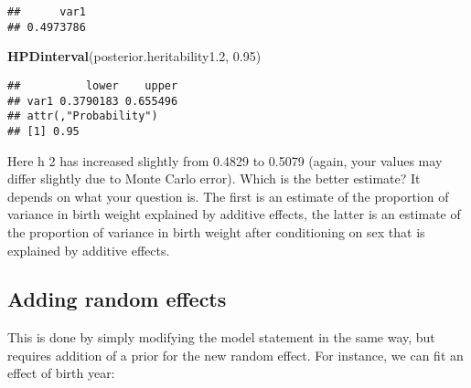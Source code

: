 \documentclass[12pt,]{book}
\newenvironment{Shaded}{\begin{snugshade}}{\end{snugshade}}
\newcommand{\FloatTok}[1]{\textcolor[rgb]{0.00,0.00,0.81}{#1}}
\newcommand{\KeywordTok}[1]{\textcolor[rgb]{0.13,0.29,0.53}{\textbf{#1}}}
\newcommand{\NormalTok}[1]{#1}
\newcommand{\OperatorTok}[1]{\textcolor[rgb]{0.81,0.36,0.00}{\textbf{#1}}}
\newcommand{\StringTok}[1]{\textcolor[rgb]{0.31,0.60,0.02}{#1}}
\begin{document}
\begin{Shaded}
\end{Shaded}

\begin{verbatim}
##      var1 
## 0.4973786
\end{verbatim}

\begin{Shaded}
\begin{Highlighting}[]
\KeywordTok{HPDinterval}\NormalTok{(posterior.heritability1}\FloatTok{.2}\NormalTok{, }\FloatTok{0.95}\NormalTok{)}
\end{Highlighting}
\end{Shaded}

\begin{verbatim}
##          lower    upper
## var1 0.3790183 0.655496
## attr(,"Probability")
## [1] 0.95
\end{verbatim}

Here h 2 has increased slightly from 0.4829 to 0.5079 (again, your values may differ slightly due to Monte Carlo error). Which is the better estimate? It depends on what your question is. The first is an estimate of the proportion of variance in birth weight explained by additive effects, the latter is an estimate of the proportion of variance in birth weight after conditioning on sex that is explained by additive effects.

\hypertarget{adding-random-effects-1}{%
\subsection{Adding random effects}\label{adding-random-effects-1}}

This is done by simply modifying the model statement in the same way, but requires addition of a prior for the new random effect. For instance, we can fit an effect of birth year:
\end{document}
